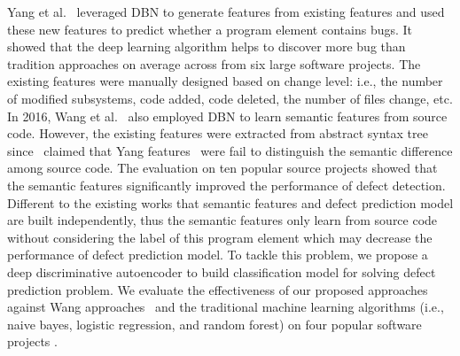 Yang et al.~\cite{yang2015deep} leveraged DBN to generate features from existing features and used these new features to predict whether a program element contains bugs. It showed that the deep learning algorithm helps to discover more bug than tradition approaches on average across from six large software projects. The existing features were manually designed based on change level: i.e., the number of modified subsystems, code added, code deleted, the number of files change, etc. In 2016, Wang et al.~\cite{wang2016automatically} also employed DBN to learn semantic features from source code. However, the existing features were extracted from abstract syntax tree since~\cite{wang2012compressed} claimed that Yang features~\cite{yang2015deep} were fail to distinguish the semantic difference among source code. The evaluation on ten popular source projects showed that the semantic features significantly improved the performance of defect detection. Different to the existing works that semantic features and defect prediction model are built independently, thus the semantic features only learn from source code without considering the label of this program element which may decrease the performance of defect prediction model. To tackle this problem, we propose a deep  discriminative autoencoder to build classification model for solving defect prediction problem.  We evaluate the effectiveness of our proposed approaches against Wang approaches~\cite{wang2012compressed} and the traditional machine learning algorithms (i.e., naive bayes, logistic regression, and random forest) on four popular software projects .


